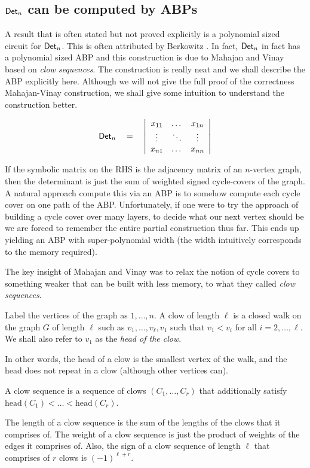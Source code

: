 \subsection{$\mathsf{Det}_n$ can be computed by ABPs}

A result that is often stated but not proved explicitly is a polynomial sized circuit for $\mathsf{Det}_n$. This is often attributed by Berkowitz \cite{Berk84}. In fact, $\mathsf{Det}_n$ in fact has a polynomial sized ABP and this construction is due to Mahajan and Vinay~\cite{mv97} based on \emph{clow sequences}. The construction is really neat and we shall describe the ABP explicitly here. Although we will not give the full proof of the correctness Mahajan-Vinay construction, we shall give some intuition to understand the construction better. 

\[
\mathsf{Det}_n \quad = \quad \left|\begin{array}{ccc}
x_{11} & \dots & x_{1n}\\
\vdots & \ddots & \vdots \\
x_{n1} & \dots & x_{nn}
\end{array}
\right|\]

If the symbolic matrix on the RHS is the adjacency matrix of an $n$-vertex graph, then the determinant is just the sum of weighted signed cycle-covers of the graph. A natural approach compute this via an ABP is to somehow compute each cycle cover on one path of the ABP. Unfortunately, if one were to try the \naive approach of building a cycle cover over many layers, to decide what our next vertex should be we are forced to remember the entire partial construction thus far. This ends up yielding an ABP with super-polynomial width (the width intuitively corresponds to the memory required). 

The key insight of Mahajan and Vinay was to relax the notion of cycle covers to something weaker that can be built with less memory, to what they called \emph{clow sequences}. 

\begin{definition}
Label the vertices of the graph as $1,\dots, n$. A clow  of length $\ell$ is a closed walk on the graph $G$ of length $\ell$ such as $v_1,\dots, v_\ell,v_1$ such that $v_1 < v_i$ for all $i=2,\dots, \ell$. We shall also refer to $v_1$ as the \emph{head of the clow}. 

In other words, the head of a clow is the smallest vertex of the walk, and the head does not repeat in a clow (although other vertices can). 

A clow sequence is a sequence of clows $(C_1,\dots, C_r)$ that additionally satisfy $\mathrm{head}(C_1) < \dots < \mathrm{head}(C_r)$. 

The length of a clow sequence is the sum of the lengths of the clows that it comprises of. The weight of a clow sequence is just the product of weights of the edges it comprises of. Also, the sign of a clow sequence of length $\ell$ that comprises of $r$ clows is $(-1)^{\ell + r}$. 
\end{definition}

